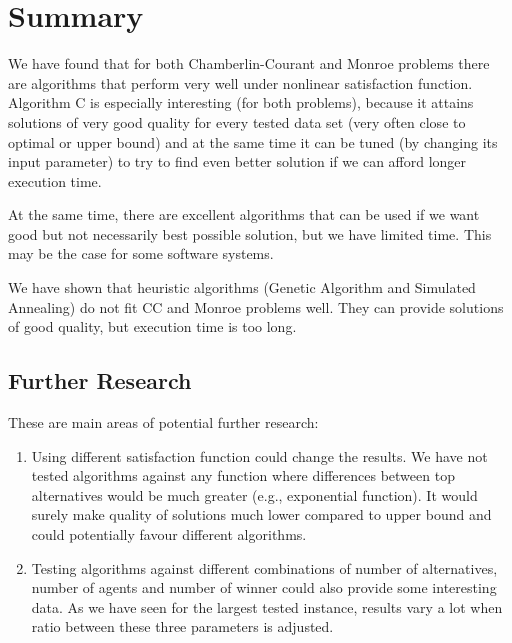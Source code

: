 \chapter{Summary}
\label{cha:testy}

We have found that for both Chamberlin-Courant and Monroe problems there are algorithms that perform very well under nonlinear satisfaction function. Algorithm C is especially interesting (for both problems), because it attains solutions of very good quality for every tested data set (very often close to optimal or upper bound) and at the same time it can be tuned (by changing its input parameter) to try to find even better solution if we can afford longer execution time.

At the same time, there are excellent algorithms that can be used if we want good but not necessarily best possible solution, but we have limited time. This may be the case for some software systems.

We have shown that heuristic algorithms (Genetic Algorithm and Simulated Annealing) do not fit CC and Monroe problems well. They can provide solutions of good quality, but execution time is too long.

\section{Further Research}

These are main areas of potential further research:
\begin{enumerate}
	\item Using different satisfaction function could change the results. We have not tested algorithms against any function where differences between top alternatives would be much greater (e.g., exponential function). It would surely make quality of solutions much lower compared to upper bound and could potentially favour different algorithms.
	\item Testing algorithms against different combinations of number of alternatives, number of agents and number of winner could also provide some interesting data. As we have seen for the largest tested instance, results vary a lot when ratio between these three parameters is adjusted.
\end{enumerate}
